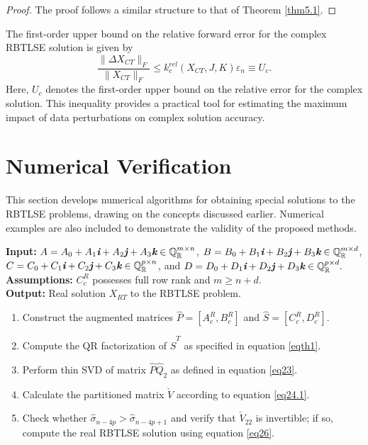 \documentclass[preprint,11pt,3p]{elsarticle}
\def \QR{\mathbb{Q}_\mathbb{R}}
\def \i{\textit{\textbf{i}}}
\def \j{\textit{\textbf{j}}}
\def \k{\textit{\textbf{k}}}
\begin{document}
\begin{proof}
	The proof follows a similar structure to that of Theorem \ref{thm5.1}.
\end{proof}
The first-order upper bound on the relative forward error for the complex RBTLSE solution is given by
\begin{equation}\label{eq5.15}
	\frac{\| \Delta X_{CT} \|_F}{\|X_{CT} \|_F} \leq \mathit{k}^{rel}_{c}(X_{CT},J,K) \varepsilon_n \equiv U_c.
\end{equation}
Here, $U_c$ denotes the first-order upper bound on the relative error for the complex solution. This inequality provides a practical tool for estimating the maximum impact of data perturbations on complex solution accuracy.

\section{Numerical Verification}\label{sec6}
This section develops numerical algorithms for obtaining special solutions to the RBTLSE problems, drawing on the concepts discussed earlier. Numerical examples are also included to demonstrate the validity of the proposed methods.
\begin{algorithm} [H]
	\caption{For real solution of RBTLSE problem}\label{alg3}
	\textbf{Input:} $A= A_0+ A_1\i+ A_2\j+ A_3\k \in \QR^{m \times n}$, $B= B_0+ B_1\i+ B_2\j+ B_3\k \in \QR^{m \times d}$, $C= C_0+ C_1\i+ C_2\j+ C_3\k \in  \QR^{p \times n}$, and $D= D_0+ D_1\i+ D_2\j+ D_3\k \in \QR^{p \times d}.$ \\
	\textbf{Assumptions:}  $C^R_c$ possesses full row rank and $m \geq n+d$.\\
	\textbf{Output:} Real solution $X_{RT}$ to the RBTLSE problem.
	\begin{enumerate}
		\item Construct the augmented matrices $\hat{P} = [A^R_c, B^R_c]$ and $\hat{S} = [C^R_c, D^R_c]$.
		\item Compute the QR factorization of $\hat{S}^T$ as specified in equation \eqref{eqth1}.
		\item Perform thin SVD of matrix $\hat{P}\hat{Q}_2$ as defined in equation \eqref{eq23}.
		\item Calculate the partitioned matrix $\check{V}$ according to equation \eqref{eq24.1}.
		\item Check whether $\hat{\sigma}_{n-4p} > \hat{\sigma}_{n-4p+1}$ and verify that $\check{V}_{22}$ is invertible; if so, compute the real RBTLSE solution using equation \eqref{eq26}.
\end{enumerate}
	\vspace{-0.2cm}
\end{algorithm}
\end{document}
